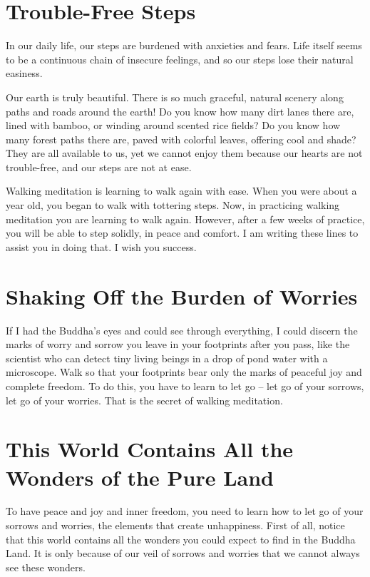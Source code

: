 \documentclass[a4paper,12pt,twocolumn]{article}
\begin{document}
   

  \section{Trouble-Free Steps}

  In our daily life, our steps are burdened with anxieties and fears.  Life itself seems to be a continuous chain of insecure feelings, and so our steps lose their natural easiness. 

  Our earth is truly beautiful.  There is so much graceful, natural scenery along paths and roads around the earth!  Do you know how many dirt lanes there are, lined with bamboo, or winding around scented rice fields?  Do you know how many forest paths there are, paved with colorful leaves, offering cool and shade?  They are all available to us, yet we cannot enjoy them because our hearts are not trouble-free, and our steps are not at ease.

  Walking meditation is learning to walk again with ease.  When you were about a year old, you began to walk with tottering steps.  Now, in practicing walking meditation you are learning to walk again.  However, after a few weeks of practice, you will be able to step solidly, in peace and comfort.  I am writing these lines to assist you in doing that.  I wish you success.

   

  \section{Shaking Off the Burden of Worries}

  If I had the Buddha’s eyes and could see through everything, I could discern the marks of worry and sorrow you leave in your footprints after you pass, like the scientist who can detect tiny living beings in a drop of pond water with a microscope.  Walk so that your footprints bear only the marks of peaceful joy and complete freedom.  To do this, you have to learn to let go – let go of your sorrows, let go of your worries.  That is the secret of walking meditation.

   

  \section{This World Contains All the Wonders of the Pure Land}

  To have peace and joy and inner freedom, you need to learn how to let go of your sorrows and worries, the elements that create unhappiness.  First of all, notice that this world contains all the wonders you could expect to find in the Buddha Land.  It is only because of our veil of sorrows and worries that we cannot always see these wonders.
\end{document}
